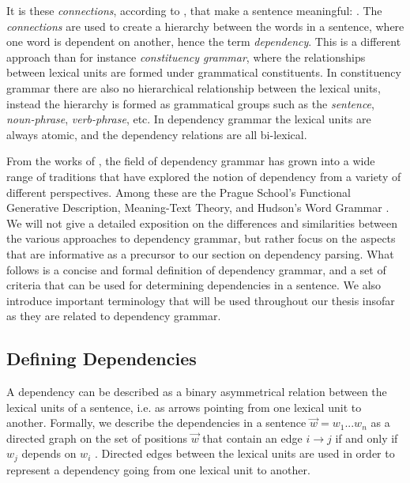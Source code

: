 It is these \textit{connections}, according to \citeauthor{Tes:15}, that make a sentence meaningful:  \cite{Tes:15}. The \textit{connections} are used to create a hierarchy between the words in a sentence, where one word is dependent on another, hence the term \textit{dependency}. This is a different approach than for instance \textit{constituency grammar}, where the relationships between lexical units are formed under grammatical constituents. In constituency grammar there are also no hierarchical relationship between the lexical units, instead the hierarchy is formed as grammatical groups such as the \textit{sentence}, \textit{noun-phrase}, \textit{verb-phrase}, etc. In dependency grammar the lexical units are always atomic, and the dependency relations are all bi-lexical.

From the works of \citeauthor{Tes:15}, the field of dependency grammar has grown into a wide range of traditions that have explored the notion of dependency from a variety of different perspectives. Among these are the Prague School's Functional Generative Description, Meaning-Text Theory, and Hudson's Word Grammar \cite{Sgall:86, Mel:88, Hudson:90}. We will not give a detailed exposition on the differences and similarities between the various approaches to dependency grammar, but rather focus on the aspects that are informative as a precursor to our section on dependency parsing. What follows is a concise and formal definition of dependency grammar, and a set of criteria that can be used for determining dependencies in a sentence. We also introduce important terminology that will be used throughout our thesis insofar as they are related to dependency grammar.

\subsection{Defining Dependencies}
\label{definitions}

A dependency can be described as a binary asymmetrical relation between the lexical units of a sentence, i.e. as arrows pointing from one lexical unit to another. Formally, we describe the dependencies in a sentence $\vec{w} = w_1 ... w_n$ as a directed graph on the set of positions $\vec{w}$ that contain an edge $i \rightarrow j$ if and only if $w_j$ depends on $w_i$ \cite{Kuhl:10}. Directed edges between the lexical units are used in order to represent a dependency going from one lexical unit to another.

